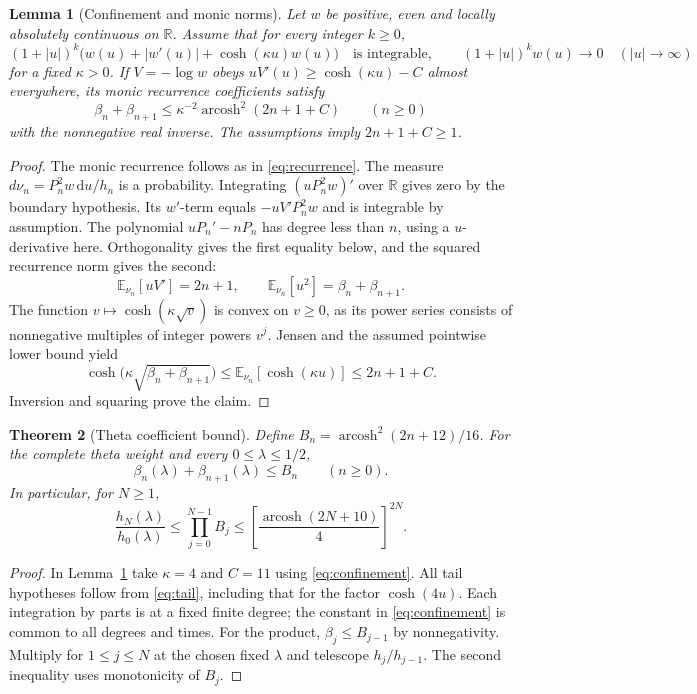 \documentclass[11pt]{article}
\newtheorem{theorem}{Theorem}[section]
\newtheorem{lemma}[theorem]{Lemma}
\numberwithin{equation}{section}
\newcommand{\dd}{\mathrm d}
\newcommand{\R}{\mathbb R}
\newcommand{\arcosh}{\operatorname{arcosh}}
\begin{document}
\begin{lemma}[Confinement and monic norms]
\label{lem:general}
Let \(w\) be positive, even and locally absolutely continuous on
\(\R\). Assume that for every integer \(k\ge0\),
\[
 (1+|u|)^k\bigl(w(u)+|w'(u)|+\cosh(\kappa u)w(u)\bigr)
 \quad\text{is integrable},\qquad
 (1+|u|)^k w(u)\longrightarrow 0
 \quad(|u|\to\infty)
\]
for a fixed \(\kappa>0\). If \(V=-\log w\) obeys
\(uV'(u)\ge\cosh(\kappa u)-C\) almost everywhere, its monic
recurrence coefficients satisfy
\[
 \beta_n+\beta_{n+1}
   \le\kappa^{-2}\arcosh^2(2n+1+C)\qquad(n\ge0)
\]
with the nonnegative real inverse. The assumptions imply \(2n+1+C\ge1\).
\end{lemma}

\begin{proof}
The monic recurrence follows as in \eqref{eq:recurrence}.
The measure \(d\nu_n=P_n^2 w\,\dd u/h_n\) is a probability.
Integrating \((uP_n^2w)'\) over \(\R\) gives zero by the
boundary hypothesis. Its \(w'\)-term equals
\(-uV'P_n^2w\) and is integrable by assumption. The polynomial
\(uP_n'-nP_n\) has degree less than \(n\), using a \(u\)-derivative
here. Orthogonality gives the first equality below, and
the squared recurrence norm gives the second:
\[
 \mathbb E_{\nu_n}[uV']=2n+1,\qquad
 \mathbb E_{\nu_n}[u^2]=\beta_n+\beta_{n+1}.
\]
The function \(v\mapsto\cosh(\kappa\sqrt v)\) is convex on
\(v\ge0\), as its power series consists of nonnegative multiples
of integer powers \(v^j\). Jensen and the assumed pointwise
lower bound yield
\[
 \cosh\bigl(\kappa\sqrt{\beta_n+\beta_{n+1}}\bigr)
  \le\mathbb E_{\nu_n}[\cosh(\kappa u)]\le 2n+1+C .
\]
Inversion and squaring prove the claim.
\end{proof}

\begin{theorem}[Theta coefficient bound]
\label{thm:theta}
Define \(B_n=\arcosh^2(2n+12)/16\). For the complete theta weight
and every \(0\le\lambda\le1/2\),
\begin{equation}
 \beta_n(\lambda)+\beta_{n+1}(\lambda)\le B_n\qquad(n\ge0).
 \label{eq:coefficient-envelope}
\end{equation}
In particular, for \(N\ge1\),
\begin{equation}
 \frac{h_N(\lambda)}{h_0(\lambda)}
 \le\prod_{j=0}^{N-1}B_j
 \le\left[\frac{\arcosh(2N+10)}{4}\right]^{2N}.
 \label{eq:product}
\end{equation}
\end{theorem}

\begin{proof}
In Lemma~\ref{lem:general} take \(\kappa=4\) and \(C=11\) using
\eqref{eq:confinement}. All tail hypotheses follow from
\eqref{eq:tail}, including that for the factor \(\cosh(4u)\).
Each integration by parts is at a fixed finite degree; the
constant in \eqref{eq:confinement} is common to all degrees and times.
For the product, \(\beta_j\le B_{j-1}\) by nonnegativity.
Multiply for \(1\le j\le N\) at the chosen fixed \(\lambda\) and
telescope \(h_j/h_{j-1}\). The second inequality uses monotonicity of \(B_j\).
\end{proof}
\end{document}
